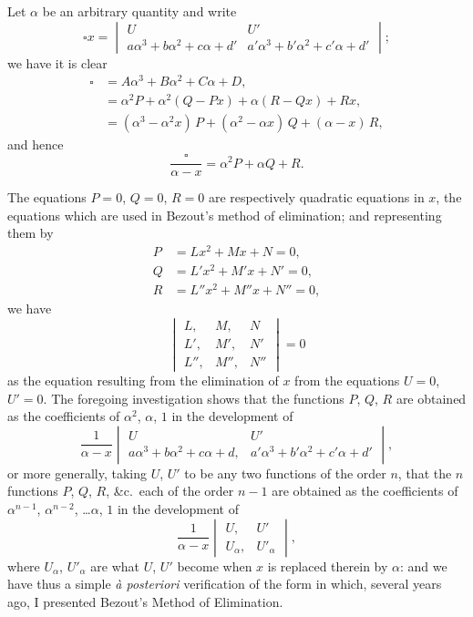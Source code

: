 \documentclass[11pt,a4paper]{article}
\begin{document}
Let $\alpha$ be an arbitrary quantity and write
\[
\square x =
\begin{vmatrix}
U & U' \\
a\alpha^3+b\alpha^2+c\alpha+d' & a'\alpha^3+b'\alpha^2+c'\alpha+d'
\end{vmatrix};
\]
we have it is clear
\begin{align*}
\square &= A\alpha^3 + B\alpha^2 + C\alpha + D,\\
&= \alpha^2 P + \alpha^2(Q-Px) + \alpha(R-Qx) + Rx,\\
&= (\alpha^3 - \alpha^2 x)\,P + (\alpha^2 - \alpha x)\,Q + (\alpha - x)\,R,
\end{align*}
and hence
\[
\frac{\square}{\alpha - x} = \alpha^2 P + \alpha Q + R.
\]

The equations $P=0$, $Q=0$, $R=0$ are respectively quadratic equations in $x$, the
equations which are used in Bezout's method of elimination; and representing them by
\begin{align*}
P &= Lx^2 + Mx + N = 0,\\
Q &= L'x^2 + M'x + N' = 0,\\
R &= L''x^2 + M''x + N'' = 0,
\end{align*}
we have
\[
\begin{vmatrix}
L, & M, & N \\
L', & M', & N' \\
L'', & M'', & N''
\end{vmatrix} = 0
\]
as the equation resulting from the elimination of $x$ from the equations $U=0$, $U'=0$.
The foregoing investigation shows that the functions $P$, $Q$, $R$ are obtained as the
coefficients of $\alpha^2$, $\alpha$, $1$ in the development of
\[
\frac{1}{\alpha - x}
\begin{vmatrix}
U & U' \\
a\alpha^3+b\alpha^2+c\alpha+d, & a'\alpha^3+b'\alpha^2+c'\alpha+d'
\end{vmatrix},
\]
or more generally, taking $U$, $U'$ to be any two functions of the order $n$, that the $n$
functions $P$, $Q$, $R$, \&c.\ each of the order $n-1$ are obtained as the coefficients of
$\alpha^{n-1}$, $\alpha^{n-2}$, \ldots $\alpha$, $1$ in the development of
\[
\frac{1}{\alpha - x}
\begin{vmatrix}
U, & U' \\
U_{\alpha}, & U'_{\alpha}
\end{vmatrix},
\]
where $U_{\alpha}$, $U'_{\alpha}$ are what $U$, $U'$ become when $x$ is replaced therein by $\alpha$: and we
have thus a simple \textit{\`{a} posteriori} verification of the form in which, several years ago,
I presented Bezout's Method of Elimination.
\end{document}
